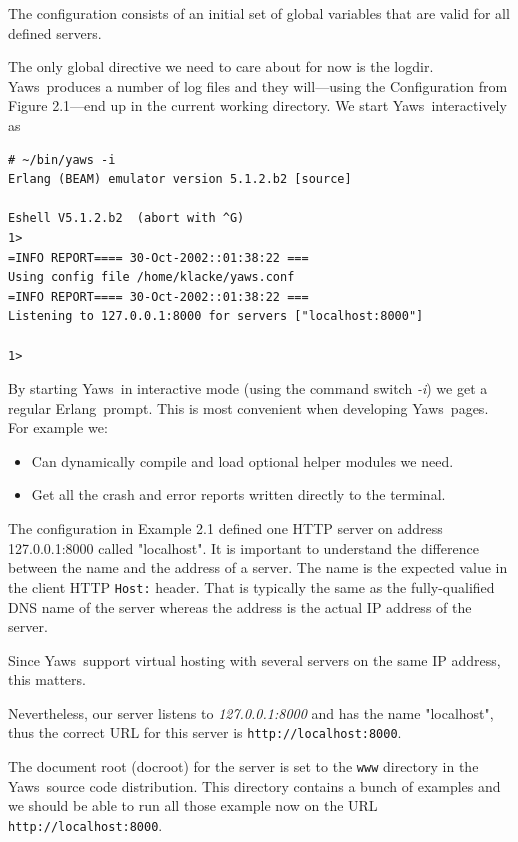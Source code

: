 \documentclass[11pt,oneside,english]{book}
\newcommand{\Erlang}            %
        {{\sc Erlang}}
\newcommand{\Yaws}            %
        {{\sc Yaws}}
\begin{document}
The configuration consists of an initial set of global
variables that are valid for all defined servers.

The only global directive we need to care about for now is the logdir.
\Yaws\ produces a number of log files and they will---using the
Configuration from Figure 2.1---end up in the current working
directory.  We start \Yaws\ interactively as

\begin{verbatim}
# ~/bin/yaws -i
Erlang (BEAM) emulator version 5.1.2.b2 [source]

Eshell V5.1.2.b2  (abort with ^G)
1>
=INFO REPORT==== 30-Oct-2002::01:38:22 ===
Using config file /home/klacke/yaws.conf
=INFO REPORT==== 30-Oct-2002::01:38:22 ===
Listening to 127.0.0.1:8000 for servers ["localhost:8000"]

1>
\end{verbatim}

By starting \Yaws\ in interactive mode (using the command switch
\textit{-i}) we get a regular \Erlang\ prompt. This is most convenient
when developing \Yaws\ pages. For example we:

\begin{itemize}
\item{Can dynamically compile and load optional helper modules we need.}
\item{Get all the crash and error reports written directly to the
terminal.}
\end{itemize}

The configuration in Example 2.1 defined one HTTP server on address
127.0.0.1:8000 called "localhost".  It is important to understand the
difference between the name and the address of a server. The name is
the expected value in the client HTTP \verb+Host:+ header. That is
typically the same as the fully-qualified DNS name of the server
whereas the address is the actual IP address of the server.

Since \Yaws\  support virtual hosting with several servers on the same
IP address, this matters.

Nevertheless, our server listens to \textit{127.0.0.1:8000} and
has the name "localhost", thus the correct URL for this server
is \verb+http://localhost:8000+.

The document root (docroot) for the server is set to the \verb+www+
directory in the \Yaws\ source code distribution. This directory
contains a bunch of examples and we should be able to run all those
 example now on the URL \verb+http://localhost:8000+.
\end{document}

